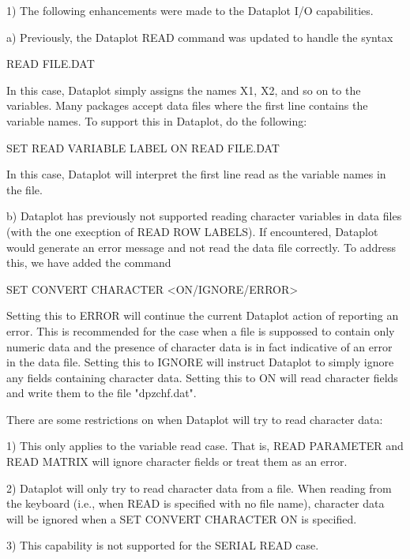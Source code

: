 { 1) The following enhancements were made to the Dataplot I/O
    capabilities.

    a) Previously, the Dataplot READ command was updated to
       handle the syntax

          READ  FILE.DAT

       In this case, Dataplot simply assigns the names X1, X2,
       and so on to the variables.  Many packages accept data
       files where the first line contains the variable names.
       To support this in Dataplot, do the following:

          SET READ VARIABLE LABEL ON
          READ FILE.DAT

       In this case, Dataplot will interpret the first line
       read as the variable names in the file.

    b) Dataplot has previously not supported reading character
       variables in data files (with the one execption of READ ROW
       LABELS).  If encountered, Dataplot would generate an error
       message and not read the data file correctly.  To address
       this, we have added the command

           SET CONVERT CHARACTER <ON/IGNORE/ERROR>

       Setting this to ERROR will continue the current Dataplot
       action of reporting an error.  This is recommended for the
       case when a file is suppossed to contain only numeric data
       and the presence of character data is in fact indicative
       of an error in the data file.  Setting this to IGNORE will
       instruct Dataplot to simply ignore any fields containing
       character data.  Setting this to ON will read character fields
       and write them to the file "dpzchf.dat".

       There are some restrictions on when Dataplot will try to
       read character data:

          1) This only applies to the variable read case.  That
             is, READ PARAMETER and READ MATRIX will ignore
             character fields or treat them as an error.

          2) Dataplot will only try to read character data from
             a file.  When reading from the keyboard (i.e., when
             READ is specified with no file name), character data
             will be ignored when a SET CONVERT CHARACTER ON is
             specified.

          3) This capability is not supported for the SERIAL READ
             case.

}
